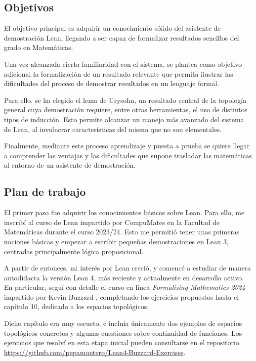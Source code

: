 \subsection{Objetivos}

El objetivo principal es adquirir un conocimiento sólido del asistente de demostración Lean, llegando a ser capaz de formalizar resultados sencillos del grado en Matemáticas.

Una vez alcanzada cierta familiaridad con el sistema, se plantea como objetivo adicional la formalización de un resultado relevante que permita ilustrar las dificultades del proceso de demostrar resultados en un lenguaje formal.

Para ello, se ha elegido el lema de Urysohn, un resultado central de la topología general cuya demostración requiere, entre otras herramientas, el uso de distintos tipos de inducción. Esto permite alcanzar un manejo más avanzado del sistema de Lean, al involucrar características del mismo que no son elementales.

Finalmente, mediante este proceso aprendizaje y puesta a prueba se quiere llegar a comprender las ventajas y las dificultades que supone trasladar las matemáticas al entorno de un asistente de demostración.

\subsection{Plan de trabajo}

El primer paso fue adquirir los conocimientos básicos sobre Lean. Para ello, me inscribí al curso de Lean impartido por CompuMates en la Facultad de Matemáticas durante el curso 2023/24. Esto me permitió tener unas primeras nociones básicas y empezar a escribir pequeñas demostraciones en Lean 3, centradas principalmente lógica proposicional.

A partir de entonces, mi interés por Lean creció, y comencé a estudiar de manera autodidacta la versión Lean 4, más reciente y actualmente en desarrollo activo. En particular, seguí con detalle el curso en línea \textit{Formalising Mathematics 2024} impartido por Kevin Buzzard \cite{buzzard2024formalising}, completando los ejercicios propuestos hasta el capítulo 10, dedicado a los espacios topológicos.

Dicho capítulo era muy escueto, e incluía únicamente dos ejemplos de espacios topológicos concretos y algunas cuestiones sobre continuidad de funciones. Los ejercicios que resolví en esta etapa inicial pueden consultarse en el repositorio \url{https://github.com/pepamontero/Lean4-Buzzard-Exercises}.

